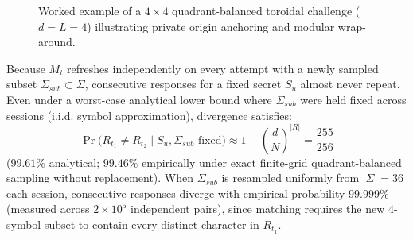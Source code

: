 \begin{figure}[!t]
{%
}
\caption{Worked example of a $4 \times 4$ quadrant-balanced toroidal challenge ($d=L=4$) illustrating private origin anchoring and modular wrap-around.}
\label{fig:worked_example}
\end{figure}

Because $M_t$ refreshes independently on every attempt with a newly sampled subset $\Sigma_{sub} \subset \Sigma$, consecutive responses for a fixed secret $S_u$ almost never repeat. Even under a worst-case analytical lower bound where $\Sigma_{sub}$ were held fixed across sessions (i.i.d. symbol approximation), divergence satisfies:
\begin{equation}
\Pr\big(R_{t_1} \ne R_{t_2} \;\big|\; S_u, \Sigma_{sub}\text{ fixed}\big) \approx 1 - \left(\frac{d}{N}\right)^{|R|} = \frac{255}{256}
\label{eq:divergence}
\end{equation}
($99.61\%$ analytical; $99.46\%$ empirically under exact finite-grid quadrant-balanced sampling without replacement). When $\Sigma_{sub}$ is resampled uniformly from $|\Sigma|=36$ each session, consecutive responses diverge with empirical probability $99.999\%$ (measured across $2 \times 10^5$ independent pairs), since matching requires the new 4-symbol subset to contain every distinct character in $R_{t_1}$.


